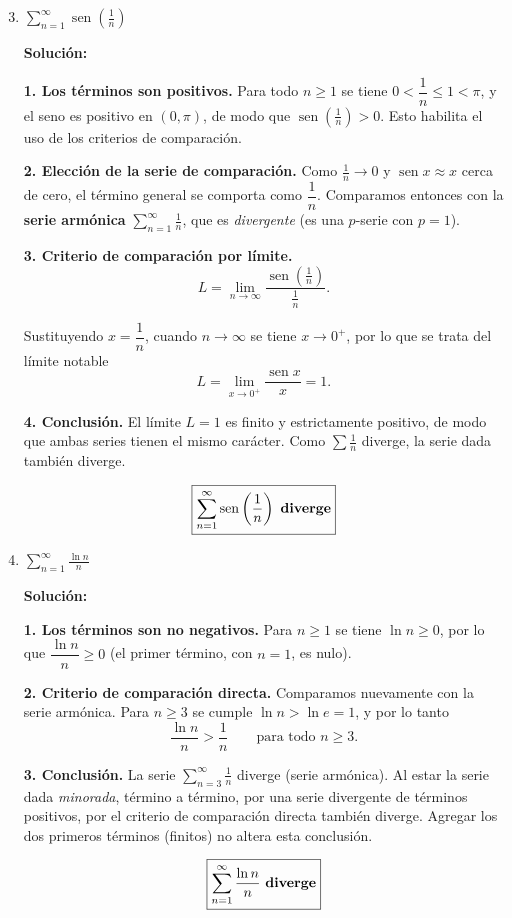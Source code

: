 \documentclass[12pt]{article}
\newcommand{\solucion}{%
    \vspace{0.8em}%
    \textbf{Solución:}%
}
\begin{document}
\begin{enumerate}[label=\alph*.-]

    \setcounter{enumi}{2} %

    \item $\displaystyle\sum_{n=1}^{\infty}\operatorname{sen}\left(\frac1n\right)$

    \solucion

    \textbf{1. Los términos son positivos.} Para todo $n\ge 1$ se tiene
    $0<\dfrac1n\le 1<\pi$, y el seno es positivo en $(0,\pi)$, de modo que
    $\operatorname{sen}\left(\frac1n\right)>0$. Esto habilita el uso de los
    criterios de comparación.

    \textbf{2. Elección de la serie de comparación.} Como $\frac1n\to 0$ y
    $\operatorname{sen}x\approx x$ cerca de cero, el término general se comporta
    como $\dfrac1n$. Comparamos entonces con la \textbf{serie armónica}
    $\displaystyle\sum_{n=1}^{\infty}\frac1n$, que es \emph{divergente}
    (es una $p$-serie con $p=1$).

    \textbf{3. Criterio de comparación por límite.}
    \[
    L=\lim_{n\to\infty}
    \frac{\operatorname{sen}\left(\frac1n\right)}{\frac1n} .
    \]

    Sustituyendo $x=\dfrac1n$, cuando $n\to\infty$ se tiene $x\to 0^{+}$, por lo
    que se trata del límite notable
    \[
    L=\lim_{x\to 0^{+}}\frac{\operatorname{sen}x}{x}=1 .
    \]

    \textbf{4. Conclusión.} El límite $L=1$ es finito y estrictamente positivo,
    de modo que ambas series tienen el mismo carácter. Como
    $\sum \frac1n$ diverge, la serie dada también diverge.

    \[
    \boxed{
    \sum_{n=1}^{\infty}\operatorname{sen}\left(\frac1n\right)
    \text{ \textbf{diverge}}
    }
    \]

				\newpage
    \item $\displaystyle\sum_{n=1}^{\infty}\frac{\ln n}{n}$

    \solucion

    \textbf{1. Los términos son no negativos.} Para $n\ge 1$ se tiene
    $\ln n\ge 0$, por lo que $\dfrac{\ln n}{n}\ge 0$ (el primer término, con
    $n=1$, es nulo).

    \textbf{2. Criterio de comparación directa.} Comparamos nuevamente con la
    serie armónica. Para $n\ge 3$ se cumple $\ln n>\ln e=1$, y por lo tanto
    \[
    \frac{\ln n}{n}>\frac{1}{n}
    \qquad\text{para todo }n\ge 3 .
    \]

    \textbf{3. Conclusión.} La serie $\displaystyle\sum_{n=3}^{\infty}\frac1n$
    diverge (serie armónica). Al estar la serie dada \emph{minorada}, término a
    término, por una serie divergente de términos positivos, por el criterio de
    comparación directa también diverge. Agregar los dos primeros términos
    (finitos) no altera esta conclusión.

    \[
    \boxed{
    \sum_{n=1}^{\infty}\frac{\ln n}{n}
    \text{ \textbf{diverge}}
    }
    \]

\end{enumerate}
\end{document}
